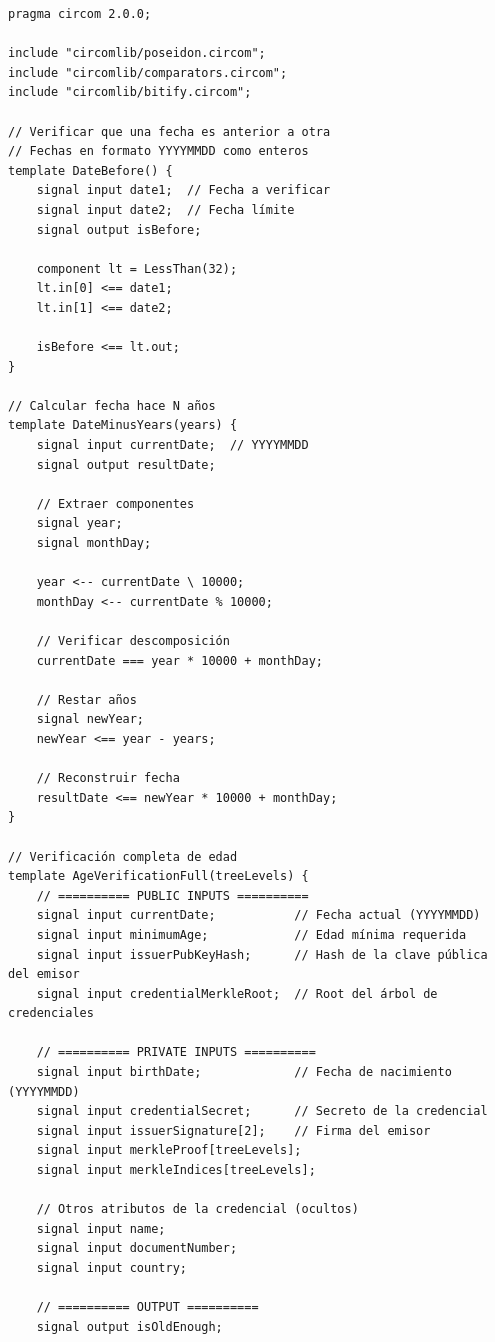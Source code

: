\documentclass[11pt,a4paper,twoside]{book}
\theoremstyle{definition}
\theoremstyle{remark}
\begin{document}
\begin{lstlisting}[language=circom, caption={Circuito completo de verificación de edad}]
pragma circom 2.0.0;

include "circomlib/poseidon.circom";
include "circomlib/comparators.circom";
include "circomlib/bitify.circom";

// Verificar que una fecha es anterior a otra
// Fechas en formato YYYYMMDD como enteros
template DateBefore() {
    signal input date1;  // Fecha a verificar
    signal input date2;  // Fecha límite
    signal output isBefore;
    
    component lt = LessThan(32);
    lt.in[0] <== date1;
    lt.in[1] <== date2;
    
    isBefore <== lt.out;
}

// Calcular fecha hace N años
template DateMinusYears(years) {
    signal input currentDate;  // YYYYMMDD
    signal output resultDate;
    
    // Extraer componentes
    signal year;
    signal monthDay;
    
    year <-- currentDate \ 10000;
    monthDay <-- currentDate % 10000;
    
    // Verificar descomposición
    currentDate === year * 10000 + monthDay;
    
    // Restar años
    signal newYear;
    newYear <== year - years;
    
    // Reconstruir fecha
    resultDate <== newYear * 10000 + monthDay;
}

// Verificación completa de edad
template AgeVerificationFull(treeLevels) {
    // ========== PUBLIC INPUTS ==========
    signal input currentDate;           // Fecha actual (YYYYMMDD)
    signal input minimumAge;            // Edad mínima requerida
    signal input issuerPubKeyHash;      // Hash de la clave pública del emisor
    signal input credentialMerkleRoot;  // Root del árbol de credenciales
    
    // ========== PRIVATE INPUTS ==========
    signal input birthDate;             // Fecha de nacimiento (YYYYMMDD)
    signal input credentialSecret;      // Secreto de la credencial
    signal input issuerSignature[2];    // Firma del emisor
    signal input merkleProof[treeLevels];
    signal input merkleIndices[treeLevels];
    
    // Otros atributos de la credencial (ocultos)
    signal input name;
    signal input documentNumber;
    signal input country;
    
    // ========== OUTPUT ==========
    signal output isOldEnough;
    

\end{lstlisting}
\end{document}

